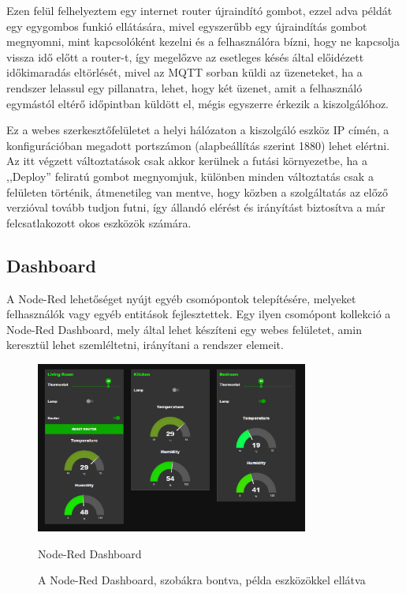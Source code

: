 \documentclass[
]{thesis-ekf}
\theoremstyle{definition}
\theoremstyle{remark}
\begin{document}
Ezen felül felhelyeztem egy internet router újraindító gombot, ezzel adva példát egy egygombos funkió ellátására, mivel egyszerűbb egy újraindítás gombot megnyomni, 
mint kapcsolóként kezelni és a felhasználóra bízni, hogy ne kapcsolja vissza idő előtt a router-t, így megelőzve az esetleges 
késés által előidézett időkimaradás eltörlését, mivel az MQTT sorban küldi az üzeneteket, ha a rendszer lelassul egy pillanatra, 
lehet, hogy két üzenet, amit a felhasználó egymástól eltérő időpintban küldött el, mégis egyszerre érkezik a kiszolgálóhoz.

Ez a webes szerkesztőfelületet a helyi hálózaton a kiszolgáló eszköz IP címén, a konfigurációban megadott portszámon (alapbeállítás szerint 1880) lehet elértni.
Az itt végzett változtatások csak akkor kerülnek a futási környezetbe, ha a ,,Deploy'' feliratú gombot megnyomjuk, különben minden változtatás
csak a felületen történik, átmenetileg van mentve, hogy közben a szolgáltatás az előző verzióval tovább tudjon futni, így
állandó elérést és irányítást biztosítva a már felcsatlakozott okos eszközök számára.

\subsection{Dashboard}
A Node-Red lehetőséget nyújt egyéb csomópontok telepítésére, melyeket felhasználók vagy egyéb entitások fejlesztettek. 
Egy ilyen csomópont kollekció a Node-Red Dashboard\cite{dashboard}, mely által lehet készíteni egy webes felületet, amin keresztül lehet szemléltetni, irányítani a rendszer elemeit. 
\begin{figure}[h]
	\centering
	\includegraphics[width=0.8\textwidth]{images/dashboard.jpg}
	\caption{Node-Red Dashboard\cite{dashboard}}
	\caption{A Node-Red Dashboard, szobákra bontva, példa eszközökkel ellátva}
\end{figure}
\end{document}
